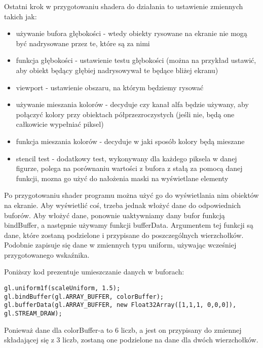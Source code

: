 Ostatni krok w przygotowaniu shadera do działania to ustawienie zmiennych takich jak:\begin{itemize}[topsep=0.2em, itemsep=0.5em, partopsep=0em, parsep=0em]
	\item używanie bufora głęboko\'sci - wtedy obiekty rysowane na ekranie nie mogą być nadrysowane przez te, które są za nimi
	\item funkcja głęboko\'sci - ustawienie testu głęboko\'sci (można na przykład ustawić, aby obiekt będący głębiej nadrysowywał te będące bliżej ekranu)
	\item viewport - ustawienie obszaru, na którym będziemy rysować
	\item używanie mieszania kolorów - decyduje czy kanał alfa będzie używany, aby połączyć kolory przy obiektach półprzezroczystych (je\'sli nie, będą one całkowicie wypełniać piksel)
	\item funkcja mieszania kolorów - decyduje w jaki sposób kolory będą mieszane
	\item stencil test - dodatkowy test, wykonywany dla każdego piksela w danej figurze, polega na porównaniu warto\'sci z bufora z stałą za pomocą danej funkcji, mozna go użyć do nałożenia maski na wy\'swietlane elementy
\end{itemize}

Po przygotowaniu shader programu można użyć go do wy\'swietlania nim obiektów na ekranie. Aby wy\'swietlić co\'s, trzeba jednak włożyć dane do odpowiednich buforów. Aby włożyć dane, ponownie uaktywniamy dany bufor funkcją bindBuffer, a następnie używamy funkcji bufferData. Argumentem tej funkcji są dane, które zostaną podzielone i przypisane do poszczególnych wierzchołków. Podobnie zapisuje się dane w zmiennych typu uniform, używając wcze\'sniej przygotowanego wskaźnika.

Poniższy kod prezentuje umieszczanie danych w buforach:
\begin{lstlisting}
gl.uniform1f(scaleUniform, 1.5);
gl.bindBuffer(gl.ARRAY_BUFFER, colorBuffer);
gl.bufferData(gl.ARRAY_BUFFER, new Float32Array([1,1,1, 0,0,0]), gl.STREAM_DRAW);
\end{lstlisting}

Ponieważ dane dla colorBuffer-a to 6 liczb, a jest on przypisany do zmiennej składającej się z 3 liczb, zostaną one podzielone na dane dla dwóch wierzchołków. 
\cleardoublepage